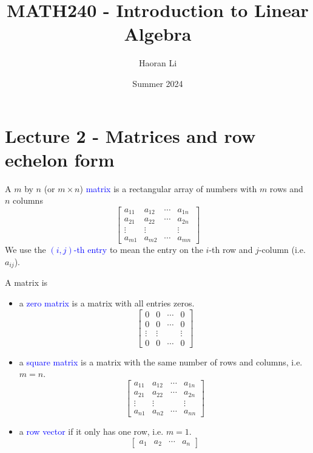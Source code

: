 \documentclass{beamer}
\title{MATH240 - Introduction to Linear Algebra}
\author{Haoran Li}
\institute[UMD]{University of Maryland, College Park}
\date{Summer 2024}
\theoremstyle{definition}
\theoremstyle{remark}
\begin{document}
\maketitle

\section{Lecture 2 - Matrices and row echelon form}

\begin{frame}[t]
\begin{definition}
A $m$ by $n$ (or $m\times n$) \textcolor{blue}{matrix} is a rectangular array of numbers with $m$ rows and $n$ columns
\begin{equation}\label{eq: general m by n matrix}
\begin{bmatrix}
a_{11}&a_{12}&\cdots&a_{1n}\\
a_{21}&a_{22}&\cdots&a_{2n}\\
\vdots&\vdots&&\vdots\\
a_{m1}&a_{m2}&\cdots&a_{mn}
\end{bmatrix}
\end{equation}
We use the \textcolor{blue}{$(i,j)$-th entry} to mean the entry on the $i$-th row and $j$-column (i.e. $a_{ij}$).
\end{definition}
\end{frame}

\begin{frame}[t]
\begin{definition}
A matrix is
\begin{itemize}
\item a \textcolor{blue}{zero matrix} is a matrix with all entries zeros.
\vspace{-3mm}
\[
\begin{bmatrix}
0&0&\cdots&0\\
0&0&\cdots&0\\
\vdots&\vdots&&\vdots\\
0&0&\cdots&0
\end{bmatrix}
\]
\pause
\item a \textcolor{blue}{square matrix} is a matrix with the same number of rows and columns, i.e. $m=n$.
\vspace{-3mm}
\[
\begin{bmatrix}
a_{11}&a_{12}&\cdots&a_{1n}\\
a_{21}&a_{22}&\cdots&a_{2n}\\
\vdots&\vdots&&\vdots\\
a_{n1}&a_{n2}&\cdots&a_{nn}
\end{bmatrix}
\]
\pause
\item a \textcolor{blue}{row vector} if it only has one row, i.e. $m=1$.
\vspace{-3mm}
\[
\begin{bmatrix}
a_{1}&a_{2}&\cdots&a_{n}
\end{bmatrix}
\]
\end{itemize}
\end{definition}
\end{frame}
\end{document}
